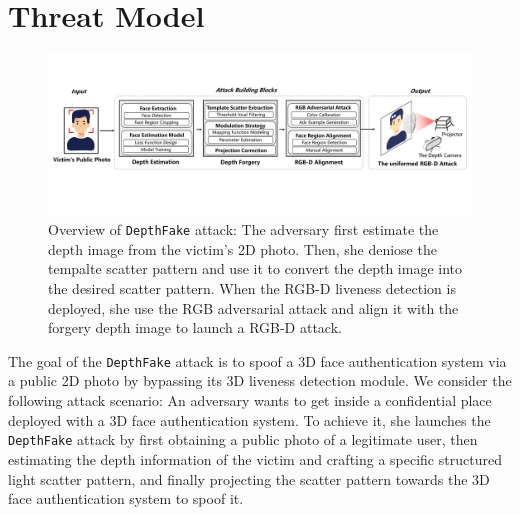 
\section{Threat Model}


\begin{figure}[pt]
	\centerline{\includegraphics[width = \textwidth]{figures/overview_1.pdf}}
	\vspace{-0.1in}
	\caption{Overview of \texttt{DepthFake} attack: The adversary first estimate the depth image from the victim's 2D photo. Then, she deniose the tempalte scatter pattern and use it to convert the depth image into the desired scatter pattern. When the RGB-D liveness detection is deployed, she use the RGB adversarial attack and align it with the forgery depth image to launch a RGB-D attack.}
	\label{overview}
	\vspace{-0.15in}
\end{figure}

The goal of the \texttt{DepthFake} attack is to spoof a 3D face authentication system via a public 2D photo by bypassing its 3D liveness detection module. We consider the following attack scenario: An adversary wants to get inside a confidential place deployed with  a 3D face authentication system. To achieve it, she  launches the \texttt{DepthFake} attack by
first obtaining a public photo of a legitimate user, then estimating the depth information of the victim and crafting a specific structured light scatter pattern, and finally projecting the scatter pattern towards the 3D face authentication system to spoof it.
%
%


